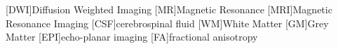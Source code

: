 
[DWI]{Diffusion Weighted Imaging}
[MR]{Magnetic Resonance}
[MRI]{Magnetic Resonance Imaging}
[CSF]{cerebrospinal fluid}
[WM]{White Matter}
[GM]{Grey Matter}
[EPI]{echo-planar imaging}
[FA]{fractional anisotropy}